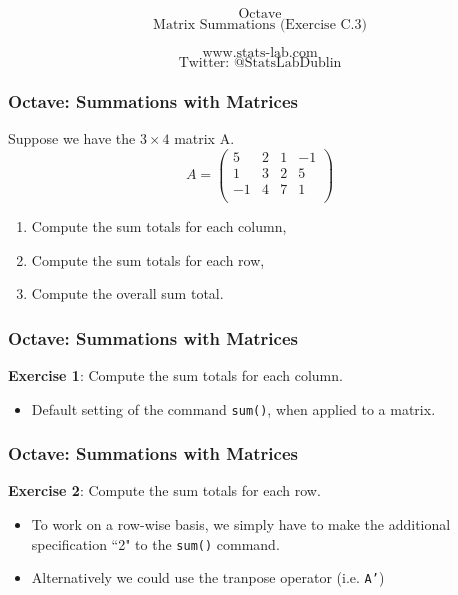\documentclass{beamer}
\begin{document}
\begin{frame}
\bigskip
{
\Huge
\[ \mbox{Octave}  \]
}
{
\huge
\[ \mbox{Matrix Summations (Exercise C.3)}  \]
}

{
\LARGE
\[ \mbox{www.stats-lab.com}  \]
\[ \mbox{Twitter: @StatsLabDublin} \]
}

\end{frame}
\begin{frame}
\frametitle{Octave: Summations with Matrices}
{
\Large
Suppose we have the $3 \times 4$ matrix A.
}
{\Large
\[ 
A = \left(
\begin{array}{cccc}
 5 & 2 & 1 & -1 \\ 
 1 & 3 & 2 & 5 \\ 
 -1 & 4 & 7 & 1 \\ 
\end{array} \right)
\]
}
{
\Large
\begin{enumerate}
\item Compute the sum totals for each column,
\item Compute the sum totals for each row,
\item Compute the overall sum total.
\end{enumerate}
}
\end{frame}
\begin{frame}
\frametitle{Octave: Summations with Matrices}
\LARGE
\textbf{Exercise 1}: Compute the sum totals for each column.\\

\begin{itemize}
\item Default setting of the command \texttt{sum()}, when applied to a matrix.
\end{itemize} 

\end{frame}
\begin{frame}
\frametitle{Octave: Summations with Matrices}
\LARGE
\textbf{Exercise 2}: Compute the sum totals for each row.\\

\begin{itemize}
\item To work on a row-wise basis, we simply have to make the additional specification ``2" to the \texttt{sum()} command.
\item Alternatively we could use the tranpose operator (i.e.  \texttt{A'})
\end{itemize} 

\end{frame}
\end{document}
